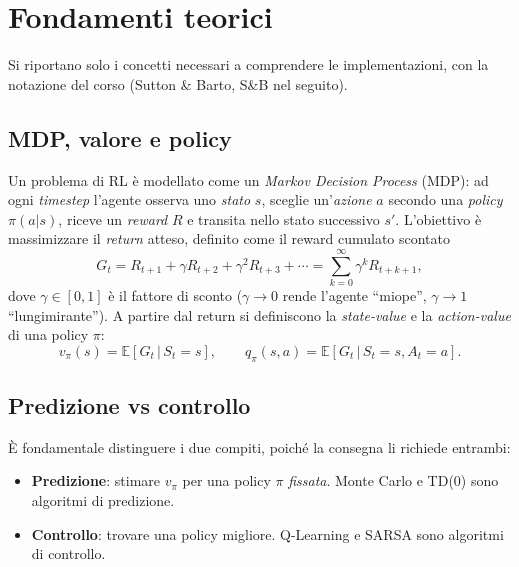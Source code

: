 \section{Fondamenti teorici}
\label{sec:theory}

Si riportano solo i concetti necessari a comprendere le implementazioni, con la
notazione del corso (Sutton \& Barto, S\&B nel seguito).

\subsection{MDP, valore e policy}
Un problema di RL \`e modellato come un \emph{Markov Decision Process} (MDP): ad ogni
\emph{timestep} l'agente osserva uno \emph{stato} $s$, sceglie un'\emph{azione} $a$
secondo una \emph{policy} $\pi(a|s)$, riceve un \emph{reward} $R$ e transita nello
stato successivo $s'$. L'obiettivo \`e massimizzare il \emph{return} atteso, definito come
il reward cumulato scontato
\begin{equation}
  G_t = R_{t+1} + \gamma R_{t+2} + \gamma^2 R_{t+3} + \cdots
      = \sum_{k=0}^{\infty}\gamma^k R_{t+k+1},
\end{equation}
dove $\gamma \in [0,1]$ \`e il fattore di sconto ($\gamma \to 0$ rende l'agente
``miope'', $\gamma \to 1$ ``lungimirante''). A partire dal return si definiscono la
\emph{state-value} e la \emph{action-value} di una policy $\pi$:
\begin{equation}
  v_\pi(s)=\mathbb{E}[G_t\,|\,S_t=s], \qquad
  q_\pi(s,a)=\mathbb{E}[G_t\,|\,S_t=s, A_t=a].
\end{equation}

\subsection{Predizione vs controllo}
\`E fondamentale distinguere i due compiti, poich\'e la consegna li richiede
entrambi:
\begin{itemize}[nosep]
  \item \textbf{Predizione}: stimare $v_\pi$ per una policy $\pi$
        \emph{fissata}. Monte Carlo e TD(0) sono algoritmi di predizione.
  \item \textbf{Controllo}: trovare una policy migliore. Q\hbox{-}Learning e
        SARSA sono algoritmi di controllo.
\end{itemize}

